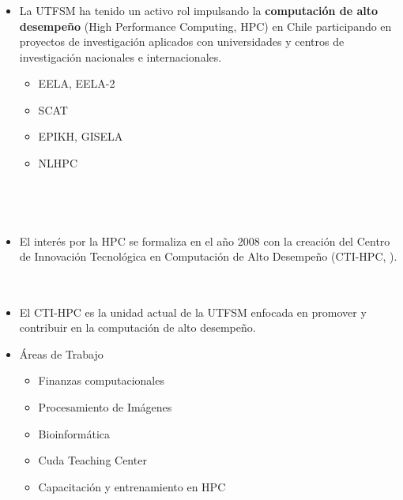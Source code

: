 
\frame
{
\frametitle{}
\begin{columns}
\begin{itemize}
\item La UTFSM ha tenido un activo rol impulsando la \textbf{computación de
alto desempeño} (High Performance Computing, HPC) en Chile participando en
proyectos
de investigación aplicados con universidades y centros de investigación
nacionales e internacionales. 
	\begin{itemize}
		\item EELA, EELA-2
		\item SCAT
		\item EPIKH, GISELA
		\item NLHPC
	\end{itemize}
\end{itemize}
\end{columns}
}


\frame
{
\frametitle{}
\begin{columns}
\begin{itemize}
\item El interés por la HPC se formaliza en el año 2008 con la creación del
Centro de Innovación Tecnológica en Computación de Alto Desempeño (CTI-HPC,
).

\end{itemize}
\end{columns}
}





\frame
{
\frametitle{}
        \begin{itemize}
	    \item El CTI-HPC es la unidad actual de la UTFSM enfocada en promover y
contribuir en la computación de alto desempeño.
	    \item Áreas de Trabajo	
		\begin{itemize}
		\item Finanzas computacionales
		\item Procesamiento de Imágenes
		\item Bioinformática
		\item Cuda Teaching Center
		\item Capacitación y entrenamiento en HPC
		\end{itemize}
        \end{itemize}
}
